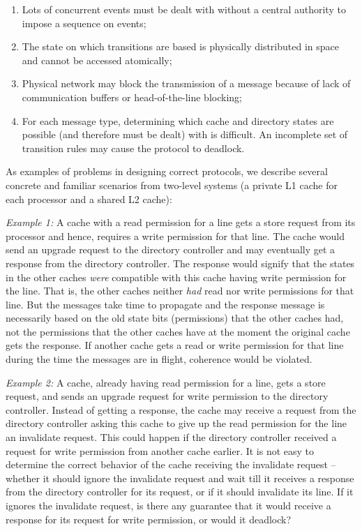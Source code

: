 \begin{enumerate}

\item Lots of concurrent events must be dealt with without a central authority
to impose a sequence on events;

\item The state on which transitions are based is physically distributed in
space and cannot be accessed atomically;

\item Physical network may block the transmission of a message because of lack
of communication buffers or head-of-the-line blocking; 

\item For each message type, determining which cache and directory states are
possible (and therefore must be dealt) with is difficult. An incomplete set of
transition rules may cause the protocol to deadlock.

\end{enumerate}

As examples of problems in designing correct protocols, we describe several
concrete and familiar scenarios from two-level systems (a private L1 cache for
each processor and a shared L2 cache):

\noindent \emph{Example 1:} A cache with a read permission for a line gets a
store request from its processor and hence, requires a write permission for
that line. The cache would send an upgrade request to the directory controller
and may eventually get a response from the directory controller. The response
would signify that the states in the other caches \emph{were} compatible with
this cache having write permission for the line. That is, the other caches
neither \emph{had} read nor write permissions for that line. But the messages
take time to propagate and the response message is necessarily based on the old
state bits (permissions) that the other caches had, not the permissions that
the other caches have at the moment the original cache gets the response. If
another cache gets a read or write permission for that line during the time the
messages are in flight, coherence would be violated.

\noindent \emph{Example 2:} A cache, already having read permission for a line,
gets a store request, and sends an upgrade request for write permission to the
directory controller. Instead of getting a response, the cache may receive a
request from the directory controller asking this cache to give up the read
permission for the line \ie an invalidate request. This could happen if the
directory controller received a request for write permission from another cache
earlier. It is not easy to determine the correct behavior of the cache
receiving the invalidate request -- whether it should ignore the invalidate
request and wait till it receives a response from the directory controller for
its request, or if it should invalidate its line. If it ignores the invalidate
request, is there any guarantee that it would receive a response for its
request for write permission, or would it deadlock?

